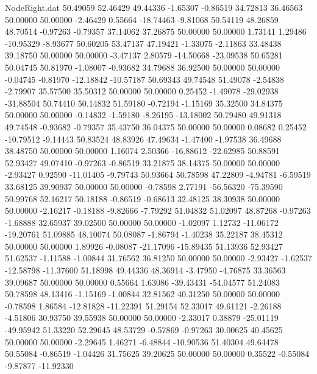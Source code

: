 \begin{filecontents}{NodeRight.dat}
  50.49059   52.46429   49.44336    -1.65307   -0.86519   34.72813   36.46563   50.00000   50.00000   -2.46429    0.55664  -18.74463   -9.81068
  50.54119   48.26859   48.70514    -0.97263   -0.79357   37.14062   37.26875   50.00000   50.00000    1.73141    1.29486  -10.95329   -8.93677
  50.60205   53.47137   47.19421    -1.33075   -2.11863   33.48438   39.18750   50.00000   50.00000   -3.47137    2.80579  -14.50668  -23.09538
  50.65281   50.04745   50.81970    -1.08007   -0.93682   34.79688   36.92500   50.00000   50.00000   -0.04745   -0.81970  -12.18842  -10.57187
  50.69343   49.74548   51.49078    -2.54838   -2.79907   35.57500   35.50312   50.00000   50.00000    0.25452   -1.49078  -29.02938  -31.88504
  50.74410   50.14832   51.59180    -0.72194   -1.15169   35.32500   34.84375   50.00000   50.00000   -0.14832   -1.59180   -8.26195  -13.18002
  50.79480   49.91318   49.74548    -0.93682   -0.79357   35.43750   36.04375   50.00000   50.00000    0.08682    0.25452  -10.79512   -9.14443
  50.83524   48.83926   47.49634    -1.47400   -1.97538   36.49688   38.48750   50.00000   50.00000    1.16074    2.50366  -16.88612  -22.62985
  50.88591   52.93427   49.07410    -0.97263   -0.86519   33.21875   38.14375   50.00000   50.00000   -2.93427    0.92590  -11.01405   -9.79743
  50.93664   50.78598   47.22809    -4.94781   -6.59519   33.68125   39.90937   50.00000   50.00000   -0.78598    2.77191  -56.56320  -75.39590
  50.99768   52.16217   50.18188    -0.86519   -0.68613   32.48125   38.30938   50.00000   50.00000   -2.16217   -0.18188   -9.82666   -7.79292
  51.04832   51.02097   48.87268    -0.97263   -1.68888   32.65937   39.02500   50.00000   50.00000   -1.02097    1.12732  -11.06172  -19.20761
  51.09885   48.10074   50.08087    -1.86794   -1.40238   35.22187   38.45312   50.00000   50.00000    1.89926   -0.08087  -21.17096  -15.89435
  51.13936   52.93427   51.62537    -1.11588   -1.00844   31.76562   36.81250   50.00000   50.00000   -2.93427   -1.62537  -12.58798  -11.37600
  51.18998   49.44336   48.36914    -3.47950   -4.76875   33.36563   39.09687   50.00000   50.00000    0.55664    1.63086  -39.43431  -54.04577
  51.24083   50.78598   48.13416    -1.15169   -1.00844   32.81562   40.31250   50.00000   50.00000   -0.78598    1.86584  -12.81828  -11.22391
  51.29154   52.33017   49.61121    -2.26188   -4.51806   30.93750   39.55938   50.00000   50.00000   -2.33017    0.38879  -25.01119  -49.95942
  51.33220   52.29645   48.53729    -0.57869   -0.97263   30.00625   40.45625   50.00000   50.00000   -2.29645    1.46271   -6.48844  -10.90536
  51.40304   49.64478   50.55084    -0.86519   -1.04426   31.75625   39.20625   50.00000   50.00000    0.35522   -0.55084   -9.87877  -11.92330

\end{filecontents}
